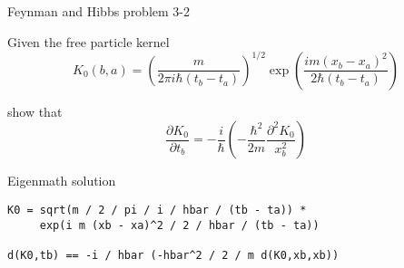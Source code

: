 \documentclass[12pt]{article}
\begin{document}
\noindent
Feynman and Hibbs problem 3-2

\bigskip
\noindent
Given the free particle kernel
\begin{equation*}
K_0(b,a)=\left(\frac{m}{2\pi i\hbar(t_b-t_a)}\right)^{1/2}
\exp\left(\frac{im(x_b-x_a)^2}{2\hbar(t_b-t_a)}\right)
\end{equation*}

\noindent
show that
\begin{equation*}
\frac{\partial K_0}{\partial t_b}
=-\frac{i}{\hbar}
\left(
-\frac{\hbar^2}{2m}
\frac{\partial^2 K_0}{x_b^2}
\right)
\end{equation*}

\bigskip
\noindent
Eigenmath solution
\begin{verbatim}
K0 = sqrt(m / 2 / pi / i / hbar / (tb - ta)) *
     exp(i m (xb - xa)^2 / 2 / hbar / (tb - ta))

d(K0,tb) == -i / hbar (-hbar^2 / 2 / m d(K0,xb,xb))
\end{verbatim}
\end{document}
